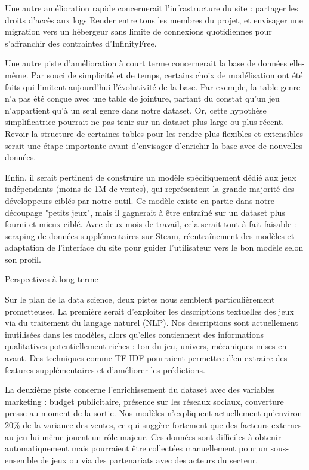 \documentclass[mstat,12pt]{unswthesis}
\begin{document}
Une autre amélioration rapide concernerait l'infrastructure du site : partager les droits d'accès aux logs Render entre tous les membres du projet, et envisager une migration vers un hébergeur sans limite de connexions quotidiennes pour s'affranchir des contraintes d'InfinityFree.

Une autre piste d'amélioration à court terme concernerait la base de données elle-même. Par souci de simplicité et de temps, certains choix de modélisation ont été faits qui limitent aujourd'hui l'évolutivité de la base. Par exemple, la table genre n'a pas été conçue avec une table de jointure, partant du constat qu'un jeu n'appartient qu'à un seul genre dans notre dataset. Or, cette hypothèse simplificatrice pourrait ne pas tenir sur un dataset plus large ou plus récent. Revoir la structure de certaines tables pour les rendre plus flexibles et extensibles serait une étape importante avant d'envisager d'enrichir la base avec de nouvelles données.

Enfin, il serait pertinent de construire un modèle spécifiquement dédié aux jeux indépendants (moins de 1M de ventes), qui représentent la grande majorité des développeurs ciblés par notre outil. Ce modèle existe en partie dans notre découpage "petits jeux", mais il gagnerait à être entraîné sur un dataset plus fourni et mieux ciblé. Avec deux mois de travail, cela serait tout à fait faisable : scraping de données supplémentaires sur Steam, réentraînement des modèles et adaptation de l'interface du site pour guider l'utilisateur vers le bon modèle selon son profil.

Perspectives à long terme

Sur le plan de la data science, deux pistes nous semblent particulièrement prometteuses. La première serait d'exploiter les descriptions textuelles des jeux via du traitement du langage naturel (NLP). Nos descriptions sont actuellement inutilisées dans les modèles, alors qu'elles contiennent des informations qualitatives potentiellement riches : ton du jeu, univers, mécaniques mises en avant. Des techniques comme TF-IDF pourraient permettre d'en extraire des features supplémentaires et d'améliorer les prédictions.

La deuxième piste concerne l'enrichissement du dataset avec des variables marketing : budget publicitaire, présence sur les réseaux sociaux, couverture presse au moment de la sortie. Nos modèles n'expliquent actuellement qu'environ 20\% de la variance des ventes, ce qui suggère fortement que des facteurs externes au jeu lui-même jouent un rôle majeur. Ces données sont difficiles à obtenir automatiquement mais pourraient être collectées manuellement pour un sous-ensemble de jeux ou via des partenariats avec des acteurs du secteur.
\end{document}
